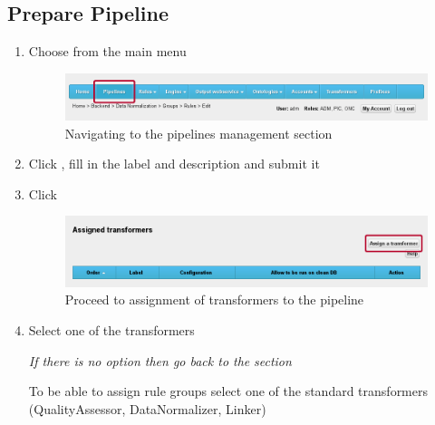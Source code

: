 \subsection*{Prepare Pipeline}
\begin{enumerate}[resume]

\vspace*{0.2\textheight}

	\item Choose  from the main menu

\begin{figure}[!ht]
    \centering
    \includegraphics[width=\textwidth]{images/fe-walkthrough-menu-pipelines.png}
    \caption{Navigating to the pipelines management section}
	\label{fig:feWTMenuPipelines}
\end{figure}
\FloatBarrier

\vspace*{0.2\textheight}

	\item Click , fill in the label and description and submit it

	\item Click 

\begin{figure}[!ht]
    \centering
    \includegraphics[width=\textwidth]{images/fe-walkthrough-assign-transformer.png}
    \caption{Proceed to assignment of transformers to the pipeline}
	\label{fig:feWTAssignTransformer}
\end{figure}
\FloatBarrier

\vspace*{0.2\textheight}

	\item Select one of the transformers
	
	\emph{If there is no option then go back to the} \textbf{} \emph{section}
	
	To be able to assign rule groups select one of the standard transformers (QualityAssessor, DataNormalizer, Linker)


\end{enumerate}
